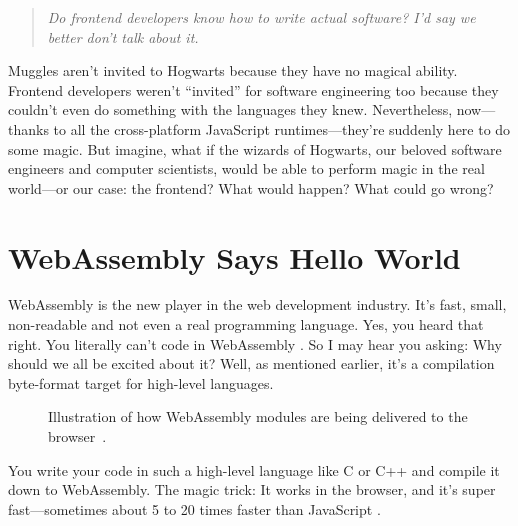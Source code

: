 \documentclass[10pt]{article}  %
\newcommand{\floatcaption}[2]{\caption[#1.]{#1~#2.}}
\begin{document}
\begin{sloppypar}
  \begin{quote}
    \emph{Do frontend developers know how to write actual software? I’d say we better don’t talk about it.}
  \end{quote}

  Muggles aren’t invited to Hogwarts because they have no magical ability. Frontend developers weren’t “invited” for software engineering too because they couldn’t even do something with the languages they knew. Nevertheless, now—thanks to all the cross-platform JavaScript runtimes—they’re suddenly here to do some magic. But imagine, what if the wizards of Hogwarts, our beloved software engineers and computer scientists, would be able to perform magic in the real world—or our case: the frontend? What would happen? What could go wrong?

  \section{WebAssembly Says Hello World}
  \label{sec:hello-world}

  WebAssembly is the new player in the web development industry. It’s fast, small, non-readable and not even a real programming language. Yes, you heard that right. You literally can’t code in WebAssembly \citep{rourke_learn_2018}. So I may hear you asking: Why should we all be excited about it? Well, as mentioned earlier, it’s a compilation byte-format target for high-level languages.

  \begin{figure}[ht]
    \centering
    \floatcaption{Illustration of how WebAssembly modules are being delivered to the browser}{\citep{logrocket_logrocket_nodate}}
    \label{fig:wasm}
  \end{figure}

  You write your code in such a high-level language like C or C++ and compile it down to WebAssembly. The magic trick: It works in the browser, and it’s super fast—sometimes about 5 to 20 times faster than JavaScript \citep{aboukhalil_how_2019}.


\end{sloppypar}
\end{document}
